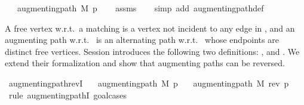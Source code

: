 \begin{isabellebody}
\ \ \ {\isachardoublequoteopen}augmenting{\isacharunderscore}{\kern0pt}path\ M\ p{\isachardoublequoteclose}%
\endisataginvisible
{\isafoldinvisible}%
%
\isadeliminvisible
\isanewline
%
\endisadeliminvisible
%
\isadelimproof
\ \ %
\endisadelimproof
%
\isatagproof
{}\isamarkupfalse%
\ assms\isanewline
\ \ \isamarkupfalse%
\ {\isacharparenleft}{\kern0pt}simp\ add{\isacharcolon}{\kern0pt}\ augmenting{\isacharunderscore}{\kern0pt}path{\isacharunderscore}{\kern0pt}def{\isacharparenright}{\kern0pt}%
\endisatagproof
{\isafoldproof}%
%
\isadelimproof
%
\endisadelimproof
%
\begin{isamarkuptext}%
A free vertex w.r.t.\ a matching  is a vertex not incident to any edge in , and an
augmenting path w.r.t.\  is an alternating path w.r.t.\  whose endpoints are
distinct free vertices. Session  introduces the following two definitions:
, and . We extend their formalization and show that
augmenting paths can be reversed.%
\end{isamarkuptext}\isamarkuptrue%
\isamarkupfalse%
\ augmenting{\isacharunderscore}{\kern0pt}path{\isacharunderscore}{\kern0pt}revI{\isacharcolon}{\kern0pt}\isanewline
\ \ \ {\isachardoublequoteopen}augmenting{\isacharunderscore}{\kern0pt}path\ M\ p{\isachardoublequoteclose}\isanewline
\ \ \ {\isachardoublequoteopen}augmenting{\isacharunderscore}{\kern0pt}path\ M\ {\isacharparenleft}{\kern0pt}rev\ p{\isacharparenright}{\kern0pt}{\isachardoublequoteclose}\isanewline
%
\isadelimproof
%
\endisadelimproof
%
\isatagproof
{}\isamarkupfalse%
\ {\isacharparenleft}{\kern0pt}rule\ augmenting{\isacharunderscore}{\kern0pt}pathI{\isacharcomma}{\kern0pt}\ goal{\isacharunderscore}{\kern0pt}cases{\isacharparenright}{\kern0pt}\isanewline

\end{isabellebody}
